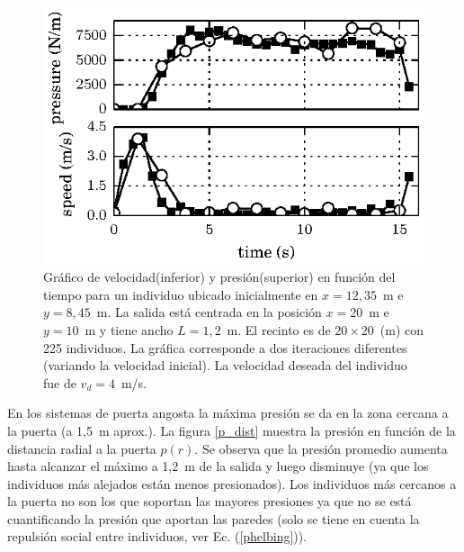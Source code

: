 \begin{figure}[H]
    \centering
    \includegraphics[scale=1.6]{figuras/p_vel_t_100_1_2.eps}
    \caption[width=5cm]{Gráfico de velocidad(inferior) y presión(superior) en función del tiempo para un individuo ubicado inicialmente en $x=12,35$~m e $y=8,45$~m.  La salida está centrada en la posición $x=20$~m e $y=10$~m y tiene ancho $L=1,2$~m. El recinto es de $20\times 20$~(m) con 225 individuos. La gráfica corresponde a dos iteraciones diferentes (variando la velocidad inicial). La velocidad deseada del individuo fue de $v_d=4$~m/s.}
    \label{pa_vel_t_100_1_2}
\end{figure}

En los sistemas de puerta angosta la máxima presión se da en la zona cercana a la puerta (a 1,5~m aprox.). La figura \ref{p_dist} muestra la presión en función de la distancia radial a la puerta $p(r)$. Se observa que la presión promedio aumenta hasta alcanzar el máximo a 1,2~m de la salida y luego disminuye (ya que los individuos más alejados están menos presionados). Los individuos más cercanos a la puerta no son los que soportan las mayores presiones ya que no se está cuantificando la presión que aportan las paredes (solo se tiene en cuenta la repulsión social entre individuos, ver Ec. (\ref{phelbing})).   


